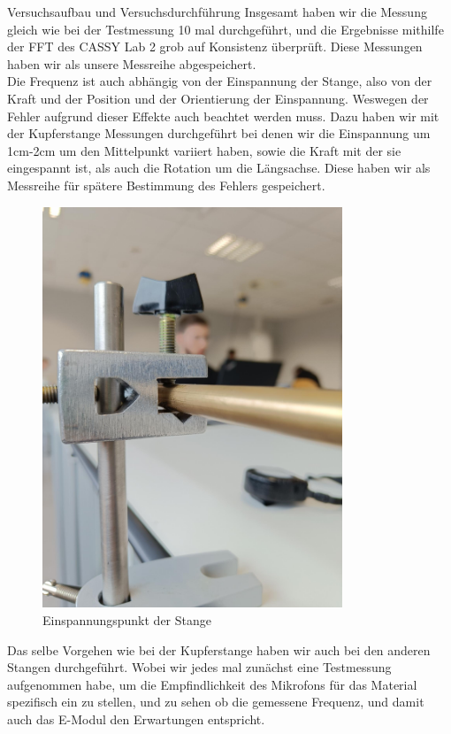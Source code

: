 \documentclass[twoside]{protokoll}
\begin{document}
\begin{aufgabe}{Versuchsaufbau und Versuchsdurchführung}
Insgesamt haben wir die Messung gleich wie bei der Testmessung 10 mal durchgeführt, und die Ergebnisse mithilfe der FFT des CASSY Lab 2 grob auf Konsistenz überprüft. Diese Messungen haben wir als unsere Messreihe abgespeichert.\\

Die Frequenz ist auch abhängig von der Einspannung der Stange, also von der Kraft und der Position und der Orientierung der Einspannung. Weswegen der Fehler aufgrund dieser Effekte auch beachtet werden muss. Dazu haben wir mit der Kupferstange Messungen durchgeführt bei denen wir die Einspannung um 1cm-2cm um den Mittelpunkt variiert haben, sowie die Kraft mit der sie eingespannt ist, als auch die Rotation um die Längsachse.
Diese haben wir als Messreihe für spätere Bestimmung des Fehlers gespeichert.\\

\begin{figure}[H]
  \centering
  \includegraphics[width=0.8\textwidth]{Bilder/434170_428396_1A3_Einspannung2.pdf}
  \caption{Einspannungspunkt der Stange}
  \centering
\end{figure}

Das selbe Vorgehen wie bei der Kupferstange haben wir auch bei den anderen Stangen durchgeführt. Wobei wir jedes mal zunächst eine Testmessung aufgenommen habe, um die Empfindlichkeit des Mikrofons für das Material spezifisch ein zu stellen, und zu sehen ob die gemessene Frequenz, und damit auch das E-Modul den Erwartungen entspricht. 


\end{aufgabe}
\end{document}
